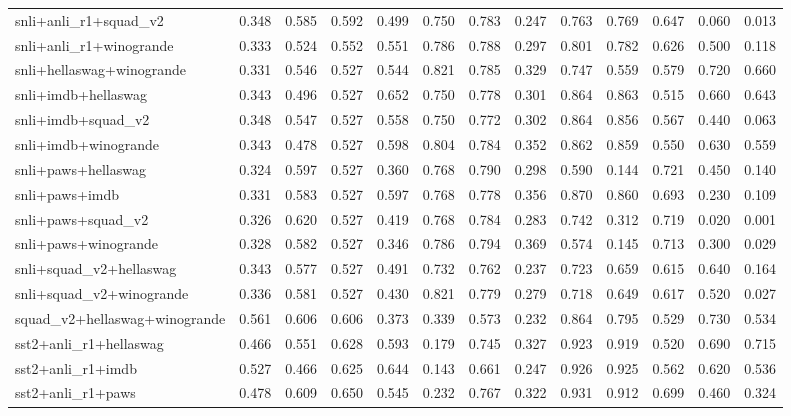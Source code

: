 \begin{table}[t]
\begin{tabular}{lrrrrrrrrrrrr}
    snli+anli\_r1+squad\_v2 & 0.348 & 0.585 & 0.592 & 0.499 & 0.750 & 0.783 & 0.247 & 0.763 & 0.769 & 0.647 & 0.060 & 0.013 \\
    snli+anli\_r1+winogrande & 0.333 & 0.524 & 0.552 & 0.551 & 0.786 & 0.788 & 0.297 & 0.801 & 0.782 & 0.626 & 0.500 & 0.118 \\
    snli+hellaswag+winogrande & 0.331 & 0.546 & 0.527 & 0.544 & 0.821 & 0.785 & 0.329 & 0.747 & 0.559 & 0.579 & 0.720 & 0.660 \\
    snli+imdb+hellaswag & 0.343 & 0.496 & 0.527 & 0.652 & 0.750 & 0.778 & 0.301 & 0.864 & 0.863 & 0.515 & 0.660 & 0.643 \\
    snli+imdb+squad\_v2 & 0.348 & 0.547 & 0.527 & 0.558 & 0.750 & 0.772 & 0.302 & 0.864 & 0.856 & 0.567 & 0.440 & 0.063 \\
    snli+imdb+winogrande & 0.343 & 0.478 & 0.527 & 0.598 & 0.804 & 0.784 & 0.352 & 0.862 & 0.859 & 0.550 & 0.630 & 0.559 \\
    snli+paws+hellaswag & 0.324 & 0.597 & 0.527 & 0.360 & 0.768 & 0.790 & 0.298 & 0.590 & 0.144 & 0.721 & 0.450 & 0.140 \\
    snli+paws+imdb & 0.331 & 0.583 & 0.527 & 0.597 & 0.768 & 0.778 & 0.356 & 0.870 & 0.860 & 0.693 & 0.230 & 0.109 \\
    snli+paws+squad\_v2 & 0.326 & 0.620 & 0.527 & 0.419 & 0.768 & 0.784 & 0.283 & 0.742 & 0.312 & 0.719 & 0.020 & 0.001 \\
    snli+paws+winogrande & 0.328 & 0.582 & 0.527 & 0.346 & 0.786 & 0.794 & 0.369 & 0.574 & 0.145 & 0.713 & 0.300 & 0.029 \\
    snli+squad\_v2+hellaswag & 0.343 & 0.577 & 0.527 & 0.491 & 0.732 & 0.762 & 0.237 & 0.723 & 0.659 & 0.615 & 0.640 & 0.164 \\
    snli+squad\_v2+winogrande & 0.336 & 0.581 & 0.527 & 0.430 & 0.821 & 0.779 & 0.279 & 0.718 & 0.649 & 0.617 & 0.520 & 0.027 \\
    squad\_v2+hellaswag+winogrande & 0.561 & 0.606 & 0.606 & 0.373 & 0.339 & 0.573 & 0.232 & 0.864 & 0.795 & 0.529 & 0.730 & 0.534 \\
    sst2+anli\_r1+hellaswag & 0.466 & 0.551 & 0.628 & 0.593 & 0.179 & 0.745 & 0.327 & 0.923 & 0.919 & 0.520 & 0.690 & 0.715 \\
    sst2+anli\_r1+imdb & 0.527 & 0.466 & 0.625 & 0.644 & 0.143 & 0.661 & 0.247 & 0.926 & 0.925 & 0.562 & 0.620 & 0.536 \\
    sst2+anli\_r1+paws & 0.478 & 0.609 & 0.650 & 0.545 & 0.232 & 0.767 & 0.322 & 0.931 & 0.912 & 0.699 & 0.460 & 0.324 \\

\end{tabular}
\end{table}

